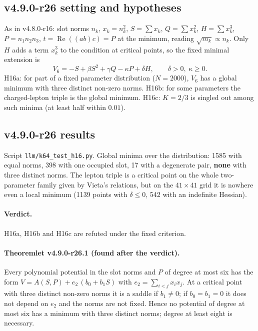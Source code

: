 \subsection*{v4.9.0-r26 setting and hypotheses}
\label{subsec:v490-r26-setting}

As in v4.8.0-r16: slot norms \(n_k\), \(x_k=n_k^2\), \(S=\sum x_k\), \(Q=\sum x_k^2\), \(H=\sum x_k^3\),
\(P=n_1n_2n_3\), \(t=\operatorname{Re}((ab)c)=P\) at the minimum, reading \(\sqrt{m_k}\propto n_k\).  Only \(H\) adds a
term \(x_k^3\) to the condition at critical points, so the fixed minimal extension is
\[
V_6=-S+\beta S^2+\gamma Q-\kappa P+\delta H,\qquad \delta>0,\ \kappa\ge0 .
\]
H16a: for part of a fixed parameter distribution (\(N=2000\)), \(V_6\) has a global minimum with three distinct non-zero
norms.  H16b: for some parameters the charged-lepton triple is the global minimum.  H16c: \(K=2/3\) is singled out among
such minima (at least half within \(0.01\)).

\subsection*{v4.9.0-r26 results}
\label{subsec:v490-r26-results}

Script \texttt{llm/k64\_test\_h16.py}.  Global minima over the distribution: 1585 with equal norms, 398 with one occupied
slot, 17 with a degenerate pair, \textbf{none} with three distinct norms.  The lepton triple is a critical point on the
whole two-parameter family given by Vieta's relations, but on the \(41\times41\) grid it is nowhere even a local minimum
(1139 points with \(\delta\le0\), 542 with an indefinite Hessian).

\paragraph{Verdict.}
H16a, H16b and H16c are refuted under the fixed criterion.

\paragraph{Theoremlet v4.9.0-r26.1 (found after the verdict).}
Every polynomial potential in the slot norms and \(P\) of degree at most six has the form
\(V=A(S,P)+e_2\,(b_0+b_1S)\) with \(e_2=\sum_{i<j}x_ix_j\).  At a critical point with three distinct non-zero norms it is
a saddle if \(b_1\neq0\); if \(b_0=b_1=0\) it does not depend on \(e_2\) and the norms are not fixed.  Hence no potential of
degree at most six has a minimum with three distinct norms; degree at least eight is necessary.

